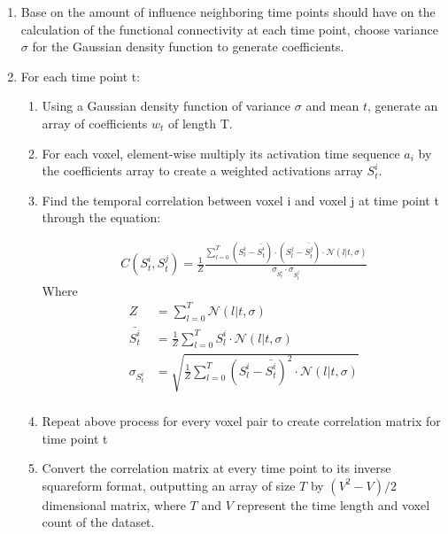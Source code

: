 \documentclass[11pt]{article}
\begin{document}
\begin{enumerate}
\item Base on the amount of influence neighboring time points should have on the calculation of the functional connectivity at each time point, choose variance $\sigma$ for the Gaussian density function to generate coefficients.

\item For each time point t:
\begin{enumerate}
\item Using a Gaussian density function of variance $\sigma$ and mean $t$, generate an array of coefficients $w_t$ of length T.

\item For each voxel, element-wise multiply its activation time sequence $a_i$ by the coefficients array to create a weighted activations array $S^i_t$.

\item Find the temporal correlation between voxel i and voxel j at time point t through the equation:

\begin{align*}
C(S^i_t,S^j_t) = \frac{1}{Z}\frac{\sum_{l=0}^T (S_l^i - \bar{S^i_t})\cdot(S^j_l - \bar{S^j_t})\cdot \mathcal{N}(l|t,\sigma)}{\sigma_{S_t^i} \cdot \sigma_{S_t^j}}
\end{align*}
Where
\begin{align*}
Z &= \sum_{l=0}^T \mathcal{N}(l|t,\sigma)\\
\bar{S^i_t} &=\frac{1}{Z} \sum_{l=0}^T S^i_l \cdot \mathcal{N}(l|t,\sigma)\\
\sigma_{S_t^i} &=\sqrt{ \frac{1}{Z}\sum_{l=0}^T (S_l^i-\bar{S_t^i})^2 \cdot \mathcal{N}(l|t,\sigma)}\\
\end{align*}
\item Repeat above process for every voxel pair to create correlation matrix for time point t
\item Convert the correlation matrix at every time point to its inverse squareform format, outputting an array of size $T$ by $(V^2-V)/2$ dimensional matrix, where $T$ and $V$ represent the time length and voxel count of the dataset.
\end{enumerate}
\end{enumerate}
\end{document}
